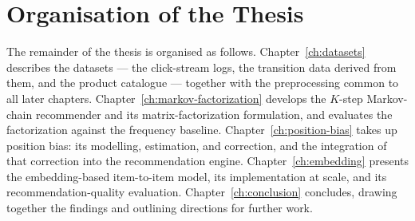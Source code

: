 \section{Organisation of the Thesis}
\label{sec:intro-organization}

The remainder of the thesis is organised as follows.
Chapter~\ref{ch:datasets} describes the datasets --- the click-stream logs, the
transition data derived from them, and the product catalogue --- together with
the preprocessing common to all later chapters.
Chapter~\ref{ch:markov-factorization} develops the $K$-step Markov-chain
recommender and its matrix-factorization formulation, and evaluates the
factorization against the frequency baseline.
Chapter~\ref{ch:position-bias} takes up position bias: its modelling,
estimation, and correction, and the integration of that correction into the
recommendation engine.
Chapter~\ref{ch:embedding} presents the embedding-based item-to-item model, its
implementation at scale, and its recommendation-quality evaluation.
Chapter~\ref{ch:conclusion} concludes, drawing together the findings and
outlining directions for further work.
